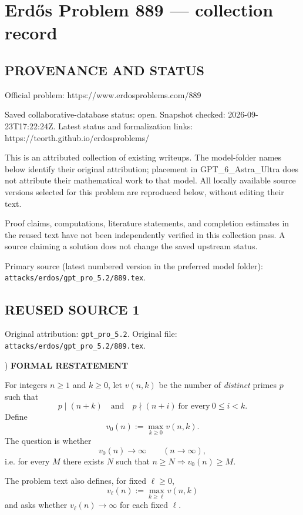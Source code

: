 \section*{Erd\H{o}s Problem 889 --- collection record}

\subsection*{PROVENANCE AND STATUS}
Official problem: https://www.erdosproblems.com/889

Saved collaborative-database status: open.
Snapshot checked: 2026-09-23T17:22:24Z.
Latest status and formalization links: https://teorth.github.io/erdosproblems/

This is an attributed collection of existing writeups. The model-folder names below identify their original attribution; placement in GPT\_6\_Astra\_Ultra does not attribute their mathematical work to that model. All locally available source versions selected for this problem are reproduced below, without editing their text.

Proof claims, computations, literature statements, and completion estimates in the reused text have not been independently verified in this collection pass. A source claiming a solution does not change the saved upstream status.

Primary source (latest numbered version in the preferred model folder): \texttt{attacks/erdos/gpt\_pro\_5.2/889.tex}.

\subsection*{REUSED SOURCE 1}
Original attribution: \texttt{gpt\_pro\_5.2}.
Original file: \texttt{attacks/erdos/gpt\_pro\_5.2/889.tex}.


) \textbf{FORMAL RESTATEMENT}

\noindent For integers $n\ge 1$ and $k\ge 0$, let $v(n,k)$ be the number of \emph{distinct} primes $p$ such that
\[
 p\mid (n+k)\quad\text{and}\quad p\nmid (n+i)\ \text{for every}\ 0\le i<k.
\]
Define
\[
 v_0(n) := \max_{k\ge 0} v(n,k).
\]
The question is whether
\[
 v_0(n) \longrightarrow \infty \qquad (n\to\infty),
\]
i.e. for every $M$ there exists $N$ such that $n\ge N\Rightarrow v_0(n)\ge M$.

\noindent The problem text also defines, for fixed $\ell\ge 0$,
\[
 v_\ell(n) := \max_{k\ge \ell} v(n,k)
\]
and asks whether $v_\ell(n)\to\infty$ for each fixed $\ell$.

